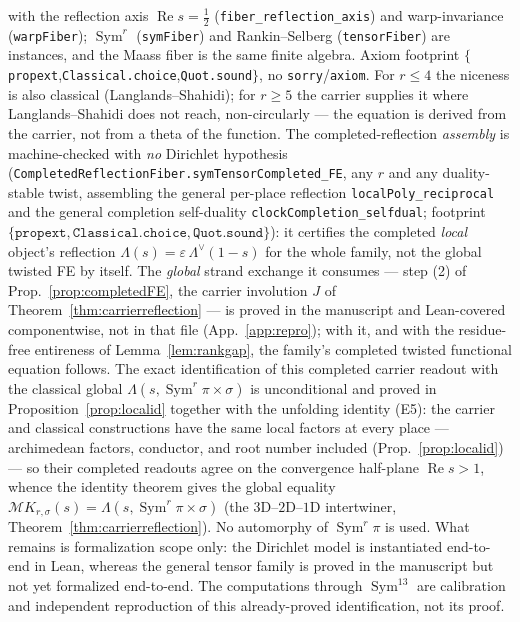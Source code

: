 \documentclass[11pt]{article}
\theoremstyle{definition}
\renewcommand{\Re}{\operatorname{Re}}
\newcommand{\Sym}{\operatorname{Sym}}
\begin{document}
\begin{itemize}
with the reflection axis $\Re s=\tfrac12$ (\texttt{fiber\_reflection\_axis}) and warp-invariance
(\texttt{warpFiber}); $\Sym^r$ (\texttt{symFiber}) and Rankin--Selberg (\texttt{tensorFiber}) are
instances, and the Maass fiber is the same finite algebra.  Axiom footprint
$\{$\texttt{propext},\texttt{Classical.choice},\texttt{Quot.sound}$\}$, no \texttt{sorry}/\texttt{axiom}.
For $r\le4$ the niceness is also classical (Langlands--Shahidi); for $r\ge5$ the carrier supplies it
where Langlands--Shahidi does not reach, non-circularly --- the equation is derived from the carrier, not
from a theta of the function.  The completed-reflection \emph{assembly} is machine-checked with \emph{no} Dirichlet hypothesis
(\texttt{CompletedReflectionFiber.symTensorCompleted\_FE}, any $r$ and any duality-stable twist, assembling the
general per-place reflection \texttt{localPoly\_reciprocal} and the general completion self-duality
\texttt{clockCompletion\_selfdual}; footprint
$\{\texttt{propext},\texttt{Classical.choice},\texttt{Quot.sound}\}$): it certifies the completed \emph{local}
object's reflection $\Lambda(s)=\varepsilon\,\Lambda^\vee(1-s)$ for the whole family, not the global twisted FE
by itself. The \emph{global} strand exchange it consumes --- step (2) of Prop.~\ref{prop:completedFE}, the
carrier involution $J$ of Theorem~\ref{thm:carrierreflection} --- is proved in the manuscript and Lean-covered
componentwise, not in that file (App.~\ref{app:repro}); with it, and with the residue-free entireness of
Lemma~\ref{lem:rankgap}, the family's completed twisted functional equation follows.  The exact identification of this completed carrier readout with the classical global
$\Lambda(s,\Sym^r\pi\times\sigma)$ is unconditional and proved in Proposition~\ref{prop:localid} together with the
unfolding identity \textup{(E5)}: the carrier and classical constructions have the same local factors at every
place --- archimedean factors, conductor, and root number included (Prop.~\ref{prop:localid}) --- so their
completed readouts agree on the convergence half-plane $\Re s>1$, whence the identity theorem gives the global
equality $\mathcal M K_{r,\sigma}(s)=\Lambda(s,\Sym^r\pi\times\sigma)$ (the $3$D--$2$D--$1$D intertwiner,
Theorem~\ref{thm:carrierreflection}). No automorphy of $\Sym^r\pi$ is used. What remains is formalization scope
only: the Dirichlet model is instantiated end-to-end in Lean, whereas the general tensor family is proved in the
manuscript but not yet formalized end-to-end. The computations through $\Sym^{13}$ are calibration and independent
reproduction of this already-proved identification, not its proof.


\end{itemize}
\end{document}

